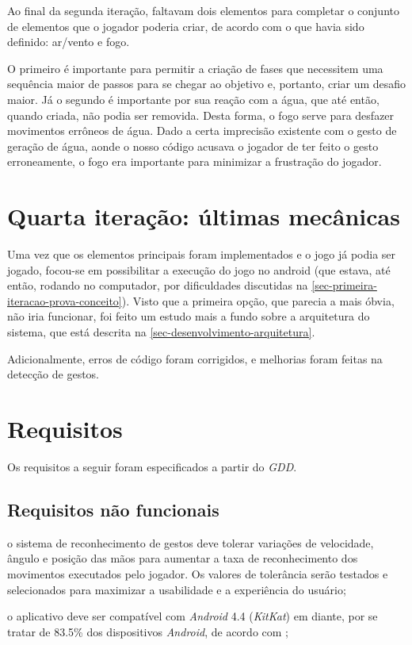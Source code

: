 Ao final da segunda iteração, faltavam dois elementos para
completar o conjunto de elementos que o jogador poderia criar, de acordo
com o que havia sido definido: ar/vento e fogo.

O primeiro é importante para permitir a criação de fases que necessitem uma 
sequência maior de passos para se chegar ao objetivo e, portanto, criar
um desafio maior. Já o segundo é importante por sua reação com a água, 
que até então, quando criada, não podia ser removida. Desta forma, o 
fogo serve para desfazer movimentos errôneos de água. Dado a certa 
imprecisão existente com o gesto de geração de água, aonde o nosso
código acusava o jogador de ter feito o gesto erroneamente, o fogo era
importante para minimizar a frustração do jogador.

\section{Quarta iteração: últimas mecânicas}\label{sec-quarta-iteracao-integracao}

Uma vez que os elementos principais foram implementados e o jogo já podia
ser jogado, focou-se em possibilitar a execução do jogo no android 
(que estava, até então, rodando no computador, por dificuldades 
discutidas na \autoref{sec-primeira-iteracao-prova-conceito}). Visto que
a primeira opção, que parecia a mais óbvia, não iria funcionar, foi feito um 
estudo mais a fundo sobre a arquitetura do sistema, que está descrita
na \autoref{sec-desenvolvimento-arquitetura}. 

Adicionalmente, erros de código foram corrigidos, e melhorias foram
feitas na detecção de gestos.

\section{Requisitos}\label{sec-requisitos}

Os requisitos a seguir foram especificados a partir do \textit{GDD}.

\subsection{Requisitos não funcionais}\label{subsec-requisitos-nao-funcionais}

\begin{alineas}
	\item o sistema de reconhecimento de gestos deve tolerar variações 
	 de velocidade, ângulo e posição das mãos para aumentar a taxa 
 	 de reconhecimento dos movimentos executados pelo jogador. Os 
	 valores de tolerância serão testados e selecionados para maximizar 
	 a usabilidade e a experiência do usuário;
	\item o aplicativo deve ser compatível com \textit{Android} 4.4
	 (\textit{KitKat}) em diante, por se tratar de 83.5\% dos 
	 dispositivos \textit{Android}, de acordo com 
	 \cite{google:2016:androidVersion};
	
\end{alineas}


